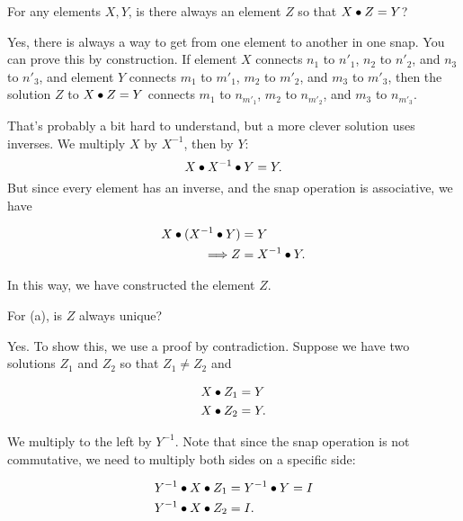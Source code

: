 \documentclass[../key.tex]{subfiles}
\begin{document}
\begin{outer_problem}
\item

\begin{inner_problem}[start=1,leftmargin=25pt]
\item For any elements $X, Y$, is there always an element $Z$ so that $X\bullet Z=Y$?
\end{inner_problem}
\end{outer_problem}

\noindent Yes, there is always a way to get from one element to another in one snap. You can prove this by construction. If element $X$ connects $n_1$ to $n'_1$, $n_2$ to $n'_2$, and $n_3$ to $n'_3$, and element $Y$ connects $m_1$ to $m'_1$, $m_2$ to $m'_2$, and $m_3$ to $m'_3$, then the solution $Z$ to $X\bullet Z=Y$ connects $m_1$ to $n_{m'_1}$, $m_2$ to $n_{m'_2}$, and $m_3$ to $n_{m'_3}$.

That's probably a bit hard to understand, but a more clever solution uses inverses. We multiply $X$ by $X^{-1}$, then by $Y$: $$X\bullet X^{-1}\bullet Y = Y.$$ But since every element has an inverse, and the snap operation is associative, we have

\begin{align*}
X\bullet (X^{-1} \bullet Y) &= Y \\
\Longrightarrow Z &= X^{-1} \bullet Y.
\end{align*}

\noindent In this way, we have constructed the element $Z$.

\begin{inner_problem}
	\item For (a), is $Z$ always unique?
\end{inner_problem}

\noindent Yes. To show this, we use a proof by contradiction. Suppose we have two solutions $Z_1$ and $Z_2$ so that $Z_1\neq Z_2$ and

\begin{align*}
X\bullet Z_1 &= Y \\
X\bullet Z_2 &= Y.
\end{align*}

\noindent We multiply to the left by $Y^{-1}$. Note that since the snap operation is not commutative, we need to multiply both sides on a specific side:

\begin{align*}
Y^{-1} \bullet X\bullet Z_1 &= Y^{-1} \bullet Y = I \\
Y^{-1} \bullet X\bullet Z_2 &= I.
\end{align*}
\end{document}
